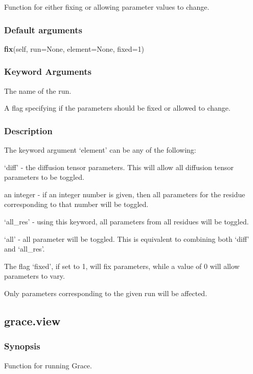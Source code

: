 Function for either fixing or allowing parameter values to change.

\subsubsection{Default arguments}

\textsf{\textbf{fix}(self, run=None, element=None, fixed=1)}


\subsubsection{Keyword Arguments}

  The name of the run.

  A flag specifying if the parameters should be fixed or allowed to change.

\subsubsection{Description}

The keyword argument `element' can be any of the following:

`diff' - the diffusion tensor parameters.  This will allow all diffusion tensor parameters
to be toggled.

an integer - if an integer number is given, then all parameters for the residue
corresponding to that number will be toggled.

`all\_res' - using this keyword, all parameters from all residues will be toggled.

`all' - all parameter will be toggled.  This is equivalent to combining both `diff' and
`all\_res'.


The flag `fixed', if set to 1, will fix parameters, while a value of 0 will allow parameters
to vary.


Only parameters corresponding to the given run will be affected.


\newpage

\subsection{grace.view}


\subsubsection{Synopsis}

Function for running Grace.

